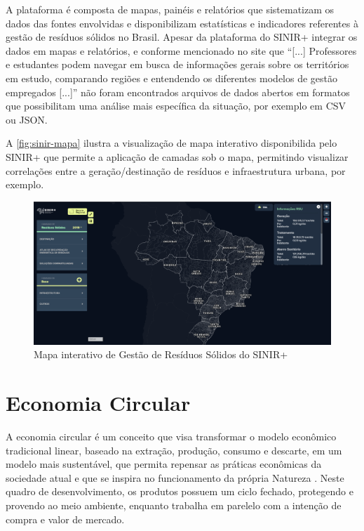 A plataforma é composta de mapas, painéis e relatórios que sistematizam os dados das fontes envolvidas e disponibilizam estatísticas e indicadores referentes à gestão de resíduos sólidos no Brasil. Apesar da plataforma do \gls{SINIR}+ integrar os dados em mapas e relatórios, e conforme mencionado no site que “[...] Professores e estudantes podem navegar em busca de informações gerais sobre os territórios em estudo, comparando regiões e entendendo os diferentes modelos de gestão empregados [...]” não foram encontrados arquivos de dados abertos em formatos que possibilitam uma análise mais específica da situação, por exemplo em \gls{CSV} ou \gls{JSON}.

A \autoref{fig:sinir-mapa} ilustra a visualização de mapa interativo disponibilida pelo \gls{SINIR}+ que permite a aplicação de camadas sob o mapa, permitindo visualizar correlações entre a geração/destinação de resíduos e infraestrutura urbana, por exemplo.

\begin{figure}[htb]
	\caption{\label{fig:sinir-mapa} Mapa interativo de Gestão de Resíduos Sólidos do \gls{SINIR}+}
	\begin{center}
		\includegraphics[scale=0.3]{images/sinir-mapa.png}
	\end{center}
\end{figure}

\pagebreak

\section{Economia Circular}
A economia circular é um conceito que visa transformar o modelo econômico tradicional linear, baseado na extração, produção, consumo e descarte, em um modelo mais sustentável, que permita repensar as práticas econômicas da sociedade atual e que se inspira no funcionamento da própria Natureza \cite{leitao_economia_2015}. Neste quadro de desenvolvimento, os produtos possuem um ciclo fechado, protegendo e provendo ao meio ambiente, enquanto trabalha em parelelo com a intenção de compra e valor de mercado.

